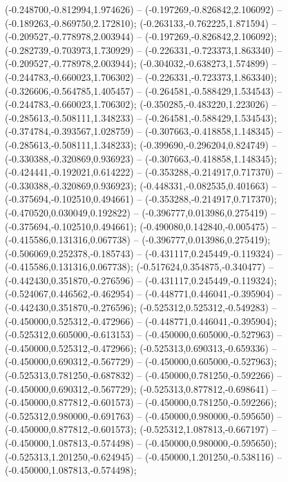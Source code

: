  (-0.248700,-0.812994,1.974626) -- (-0.197269,-0.826842,2.106092) -- (-0.189263,-0.869750,2.172810);
 (-0.263133,-0.762225,1.871594) -- (-0.209527,-0.778978,2.003944) -- (-0.197269,-0.826842,2.106092);
 (-0.282739,-0.703973,1.730929) -- (-0.226331,-0.723373,1.863340) -- (-0.209527,-0.778978,2.003944);
 (-0.304032,-0.638273,1.574899) -- (-0.244783,-0.660023,1.706302) -- (-0.226331,-0.723373,1.863340);
 (-0.326606,-0.564785,1.405457) -- (-0.264581,-0.588429,1.534543) -- (-0.244783,-0.660023,1.706302);
 (-0.350285,-0.483220,1.223026) -- (-0.285613,-0.508111,1.348233) -- (-0.264581,-0.588429,1.534543);
 (-0.374784,-0.393567,1.028759) -- (-0.307663,-0.418858,1.148345) -- (-0.285613,-0.508111,1.348233);
 (-0.399690,-0.296204,0.824749) -- (-0.330388,-0.320869,0.936923) -- (-0.307663,-0.418858,1.148345);
 (-0.424441,-0.192021,0.614222) -- (-0.353288,-0.214917,0.717370) -- (-0.330388,-0.320869,0.936923);
 (-0.448331,-0.082535,0.401663) -- (-0.375694,-0.102510,0.494661) -- (-0.353288,-0.214917,0.717370);
 (-0.470520,0.030049,0.192822) -- (-0.396777,0.013986,0.275419) -- (-0.375694,-0.102510,0.494661);
 (-0.490080,0.142840,-0.005475) -- (-0.415586,0.131316,0.067738) -- (-0.396777,0.013986,0.275419);
 (-0.506069,0.252378,-0.185743) -- (-0.431117,0.245449,-0.119324) -- (-0.415586,0.131316,0.067738);
 (-0.517624,0.354875,-0.340477) -- (-0.442430,0.351870,-0.276596) -- (-0.431117,0.245449,-0.119324);
 (-0.524067,0.446562,-0.462954) -- (-0.448771,0.446041,-0.395904) -- (-0.442430,0.351870,-0.276596);
 (-0.525312,0.525312,-0.549283) -- (-0.450000,0.525312,-0.472966) -- (-0.448771,0.446041,-0.395904);
 (-0.525312,0.605000,-0.613153) -- (-0.450000,0.605000,-0.527963) -- (-0.450000,0.525312,-0.472966);
 (-0.525313,0.690313,-0.659336) -- (-0.450000,0.690312,-0.567729) -- (-0.450000,0.605000,-0.527963);
 (-0.525313,0.781250,-0.687832) -- (-0.450000,0.781250,-0.592266) -- (-0.450000,0.690312,-0.567729);
 (-0.525313,0.877812,-0.698641) -- (-0.450000,0.877812,-0.601573) -- (-0.450000,0.781250,-0.592266);
 (-0.525312,0.980000,-0.691763) -- (-0.450000,0.980000,-0.595650) -- (-0.450000,0.877812,-0.601573);
 (-0.525312,1.087813,-0.667197) -- (-0.450000,1.087813,-0.574498) -- (-0.450000,0.980000,-0.595650);
 (-0.525313,1.201250,-0.624945) -- (-0.450000,1.201250,-0.538116) -- (-0.450000,1.087813,-0.574498);
